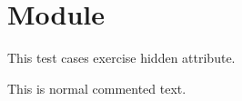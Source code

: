 \section{Module }\label{module-Hidden}%
This test cases exercise hidden attribute.

\label{module-Hidden-val-foo}\begin{ocamlindent}This is normal commented text.\end{ocamlindent}%
\medbreak
\label{module-Hidden-module-N}\begin{ocamlindent}\label{module-Hidden-module-N-val-quux}\\
\end{ocamlindent}%
\\


